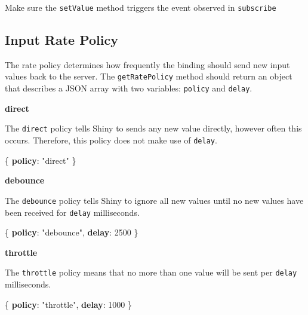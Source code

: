 \documentclass[10pt,]{krantz}
\makeatletter
\newenvironment{Shaded}{\begin{snugshade}}{\end{snugshade}}
\newcommand{\DecValTok}[1]{\textcolor[rgb]{0.06,0.06,0.06}{#1}}
\newcommand{\ErrorTok}[1]{\textcolor[rgb]{0.14,0.14,0.14}{\textbf{#1}}}
\newcommand{\FunctionTok}[1]{\textcolor[rgb]{0,0,0}{#1}}
\newcommand{\StringTok}[1]{\textcolor[rgb]{0.5,0.5,0.5}{#1}}
\newenvironment{kframe}{%
\medskip{}
\setlength{\fboxsep}{.8em}
 \def\at@end@of@kframe{}%
 \ifinner\ifhmode%
  \def\at@end@of@kframe{\end{minipage}}%
  \begin{minipage}{\columnwidth}%
 \fi\fi%
 \def\FrameCommand##1{\hskip\@totalleftmargin \hskip-\fboxsep
 \colorbox{shadecolor}{##1}\hskip-\fboxsep
     \hskip-\linewidth \hskip-\@totalleftmargin \hskip\columnwidth}%
 \MakeFramed {\advance\hsize-\width
   \@totalleftmargin\z@ \linewidth\hsize
   \@setminipage}}%
 {\par\unskip\endMakeFramed%
 \at@end@of@kframe}
\renewenvironment{Shaded}{\begin{kframe}}{\end{kframe}}
\newenvironment{rmdblock}[1]
  {
  \begin{itemize}
  \renewcommand{\labelitemi}{
    \raisebox{-.7\height}[0pt][0pt]{
      {\setkeys{Gin}{width=3em,keepaspectratio}\texttt{[image: images/\#1]}}
    }
  }
  \setlength{\fboxsep}{1em}
  \begin{kframe}
  \item
  }
  {
  \end{kframe}
  \end{itemize}
  }
\newenvironment{rmdnote}
  {\begin{rmdblock}{note}}
  {\end{rmdblock}}
\makeatother
\begin{document}
\begin{rmdnote}
Make sure the \texttt{setValue} method triggers the event observed in
\texttt{subscribe}
\end{rmdnote}

\hypertarget{shiny-input-rate-policy}{%
\subsection{Input Rate Policy}\label{shiny-input-rate-policy}}

The rate policy determines how frequently the binding should send new input values back to the server. The \texttt{getRatePolicy} method should return an object that describes a JSON array with two variables: \texttt{policy} and \texttt{delay}.

\textbf{direct}

The \texttt{direct} policy tells Shiny to sends any new value directly, however often this occurs. Therefore, this policy does not make use of \texttt{delay}.

\begin{Shaded}
\begin{Highlighting}[]
\FunctionTok{\{}
  \ErrorTok{policy}\FunctionTok{:} \StringTok{"direct"}
\FunctionTok{\}}
\end{Highlighting}
\end{Shaded}

\textbf{debounce}

The \texttt{debounce} policy tells Shiny to ignore all new values until no new values have been received for \texttt{delay} milliseconds.

\begin{Shaded}
\begin{Highlighting}[]
\FunctionTok{\{}
  \ErrorTok{policy}\FunctionTok{:} \StringTok{"debounce"}\FunctionTok{,}
  \ErrorTok{delay}\FunctionTok{:} \DecValTok{2500}
\FunctionTok{\}}
\end{Highlighting}
\end{Shaded}

\textbf{throttle}

The \texttt{throttle} policy means that no more than one value will be sent per \texttt{delay} milliseconds.

\begin{Shaded}
\begin{Highlighting}[]
\FunctionTok{\{}
  \ErrorTok{policy}\FunctionTok{:} \StringTok{"throttle"}\FunctionTok{,}
  \ErrorTok{delay}\FunctionTok{:} \DecValTok{1000}
\FunctionTok{\}}
\end{Highlighting}
\end{Shaded}
\end{document}
